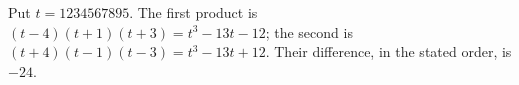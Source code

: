 Put $t=1234567895$. The first product is $(t-4)(t+1)(t+3)=t^3-13t-12$; the second is $(t+4)(t-1)(t-3)=t^3-13t+12$. Their difference, in the stated order, is $\boxed{-24}$.
